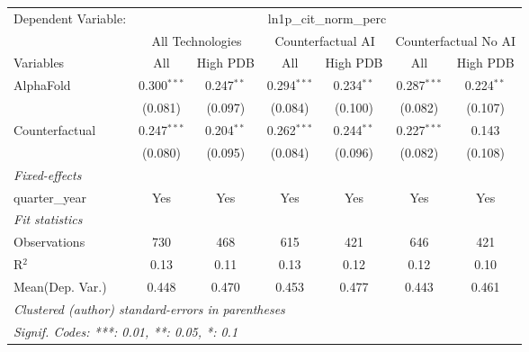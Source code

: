 \begingroup
\centering
\begin{tabular}{lcccccc}
   \tabularnewline \midrule \midrule
   Dependent Variable: & \multicolumn{6}{c}{ln1p\_cit\_norm\_perc}\\
 & \multicolumn{2}{c}{All Technologies} & \multicolumn{2}{c}{Counterfactual AI} & \multicolumn{2}{c}{Counterfactual No AI} \\
\cmidrule(lr){1-1}\cmidrule(lr){2-3} \cmidrule(lr){4-5} \cmidrule(lr){6-7}
Variables & \multicolumn{1}{c}{All} & \multicolumn{1}{c}{High PDB} & \multicolumn{1}{c}{All} & \multicolumn{1}{c}{High PDB} & \multicolumn{1}{c}{All} & \multicolumn{1}{c}{High PDB} \\
\cmidrule(lr){1-1}\cmidrule(lr){2-2} \cmidrule(lr){3-3} \cmidrule(lr){4-4} \cmidrule(lr){5-5} \cmidrule(lr){6-6} \cmidrule(lr){7-7}
   AlphaFold      & 0.300$^{***}$ & 0.247$^{**}$ & 0.294$^{***}$ & 0.234$^{**}$ & 0.287$^{***}$ & 0.224$^{**}$\\   
                  & (0.081)       & (0.097)      & (0.084)       & (0.100)      & (0.082)       & (0.107)\\   
   Counterfactual & 0.247$^{***}$ & 0.204$^{**}$ & 0.262$^{***}$ & 0.244$^{**}$ & 0.227$^{***}$ & 0.143\\   
                  & (0.080)       & (0.095)      & (0.084)       & (0.096)      & (0.082)       & (0.108)\\   
   \midrule
   \emph{Fixed-effects}\\
   quarter\_year  & Yes           & Yes          & Yes           & Yes          & Yes           & Yes\\  
   \midrule
   \emph{Fit statistics}\\
   Observations   & 730           & 468          & 615           & 421          & 646           & 421\\  
   R$^2$          & 0.13          & 0.11         & 0.13          & 0.12         & 0.12          & 0.10\\  
Mean(Dep. Var.) & 0.448 & 0.470 & 0.453 & 0.477 & 0.443 & 0.461 \\
   \midrule \midrule
   \multicolumn{7}{l}{\emph{Clustered (author) standard-errors in parentheses}}\\
   \multicolumn{7}{l}{\emph{Signif. Codes: ***: 0.01, **: 0.05, *: 0.1}}\\
\end{tabular}
\par\endgroup

